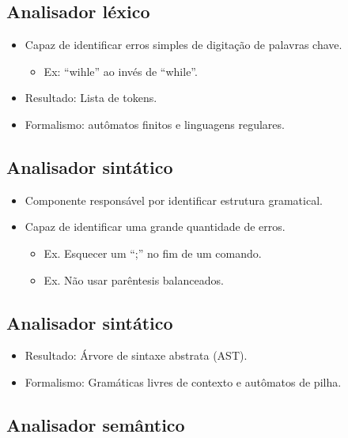 \documentclass[11pt]{article}
\begin{document}
\subsection*{Analisador léxico}
\label{sec:org2ddf42c}

\begin{itemize}
\item Capaz de identificar erros simples de digitação de palavras chave.
\begin{itemize}
\item Ex: ``wihle'' ao invés de ``while''.
\end{itemize}

\item Resultado: Lista de tokens.

\item Formalismo: autômatos finitos e linguagens regulares.
\end{itemize}
\subsection*{Analisador sintático}
\label{sec:orgc2ebca0}

\begin{itemize}
\item Componente responsável por identificar estrutura gramatical.

\item Capaz de identificar uma grande quantidade de erros.
\begin{itemize}
\item Ex. Esquecer um ``;'' no fim de um comando.
\item Ex. Não usar parêntesis balanceados.
\end{itemize}
\end{itemize}
\subsection*{Analisador sintático}
\label{sec:org433bfd3}

\begin{itemize}
\item Resultado: Árvore de sintaxe abstrata (AST).

\item Formalismo: Gramáticas livres de contexto e autômatos de pilha.
\end{itemize}
\subsection*{Analisador semântico}
\label{sec:org0a96bab}
\end{document}
